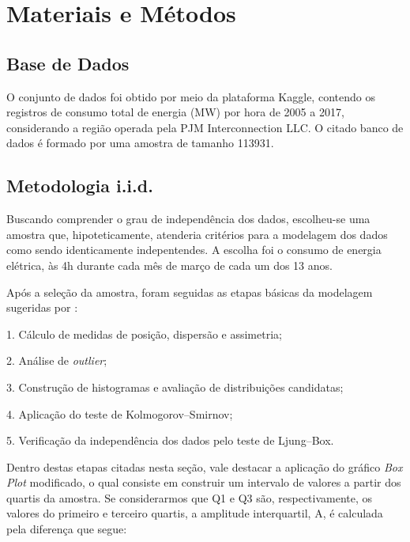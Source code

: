 \documentclass[journal]{IEEEtran}
\begin{document}
%


\section{Materiais e Métodos}
\label{prototipo}
\subsection {Base de Dados} 
O conjunto de dados foi obtido por meio da plataforma Kaggle, contendo os registros de consumo total de energia (MW) por hora de 2005 a 2017, considerando a região operada pela PJM Interconnection LLC. O citado banco de dados é formado por uma amostra de tamanho 113931\cite{Kaggle2025}.

\subsection {Metodologia i.i.d.}
Buscando comprender o grau de independência dos dados, escolheu-se uma amostra que, hipoteticamente, atenderia critérios para a modelagem dos dados como sendo identicamente indepentendes. A escolha foi o consumo de energia elétrica, às 4h durante cada mês de março de cada um dos 13 anos.

Após a seleção da amostra, foram seguidas as etapas básicas da modelagem sugeridas por \cite{chwif2010}:

1. Cálculo de medidas de posição, dispersão e assimetria;

2. Análise de \emph{outlier};

3. Construção de histogramas e avaliação de distribuições candidatas;

4. Aplicação do teste de Kolmogorov–Smirnov;

5. Verificação da independência dos dados pelo teste de Ljung–Box.

Dentro destas etapas citadas nesta seção, vale destacar a aplicação do gráfico \emph{Box Plot} modificado, o qual consiste em construir um intervalo de valores a partir dos quartis da amostra. Se considerarmos que Q1 e Q3 são, respectivamente, os valores do
 primeiro e terceiro quartis, a amplitude interquartil, A, é calculada pela diferença que segue:
\end{document}
